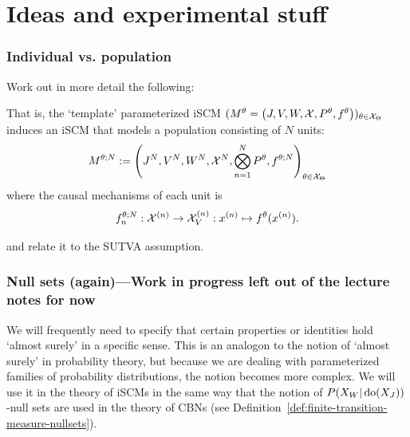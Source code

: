 \section{Ideas and experimental stuff}

\subsubsection{Individual vs. population}

Work out in more detail the following:

That is, the `template' parameterized iSCM $(M^{\theta} = \left ( J, V, W, \mathcal{X}, P^{\theta}, f^{\theta} \right ))_{\theta \in \mathcal{X}_\Theta}$ induces an iSCM that models a population consisting of $N$ units:
$$M^{\theta;N} := \left ( J^N, V^N, W^N, \mathcal{X}^N, \bigotimes_{n=1}^N P^{\theta}, f^{\theta;N} \right )_{\theta \in \mathcal{X}_\Theta}$$
where the causal mechanisms of each unit is
$$f^{\theta;N}_n : \mathcal{X}^{(n)} \to \mathcal{X}_{V}^{(n)} : x^{(n)} \mapsto f^{\theta}(x^{(n)}).$$

and relate it to the SUTVA assumption.

\subsubsection{Null sets (again)---Work in progress left out of the lecture notes for now}


We will frequently need to specify that certain properties or identities hold `almost surely' in a specific sense.
This is an analogon to the notion of `almost surely' in probability theory, but because we are dealing with parameterized families of probability distributions, the notion becomes more complex.
We will use it in the theory of iSCMs in the same way that the notion of $P(X_W|\operatorname{do}(X_J))$-null sets are used in the theory of CBNs (see Definition~\ref{def:finite-transition-measure-nullsets}).

